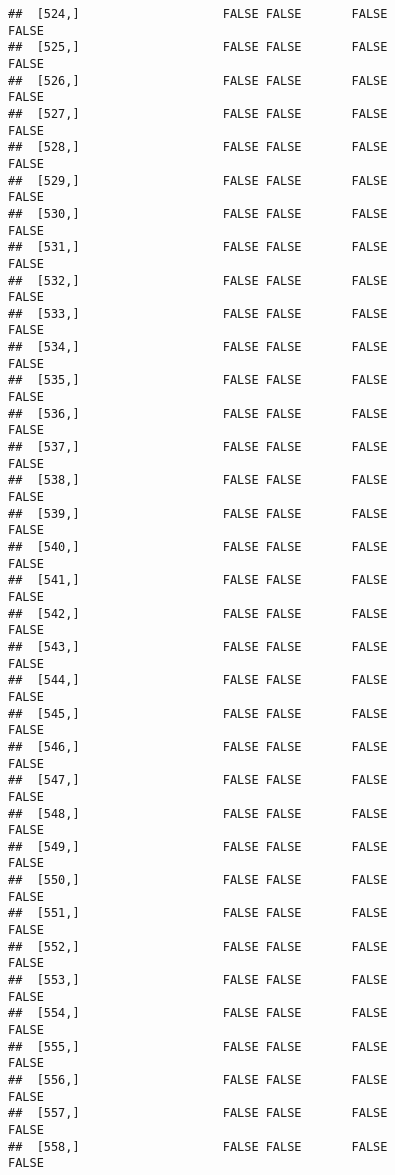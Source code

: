 \documentclass[
]{article}
\begin{document}
\begin{verbatim}
##  [524,]                    FALSE FALSE       FALSE                FALSE
##  [525,]                    FALSE FALSE       FALSE                FALSE
##  [526,]                    FALSE FALSE       FALSE                FALSE
##  [527,]                    FALSE FALSE       FALSE                FALSE
##  [528,]                    FALSE FALSE       FALSE                FALSE
##  [529,]                    FALSE FALSE       FALSE                FALSE
##  [530,]                    FALSE FALSE       FALSE                FALSE
##  [531,]                    FALSE FALSE       FALSE                FALSE
##  [532,]                    FALSE FALSE       FALSE                FALSE
##  [533,]                    FALSE FALSE       FALSE                FALSE
##  [534,]                    FALSE FALSE       FALSE                FALSE
##  [535,]                    FALSE FALSE       FALSE                FALSE
##  [536,]                    FALSE FALSE       FALSE                FALSE
##  [537,]                    FALSE FALSE       FALSE                FALSE
##  [538,]                    FALSE FALSE       FALSE                FALSE
##  [539,]                    FALSE FALSE       FALSE                FALSE
##  [540,]                    FALSE FALSE       FALSE                FALSE
##  [541,]                    FALSE FALSE       FALSE                FALSE
##  [542,]                    FALSE FALSE       FALSE                FALSE
##  [543,]                    FALSE FALSE       FALSE                FALSE
##  [544,]                    FALSE FALSE       FALSE                FALSE
##  [545,]                    FALSE FALSE       FALSE                FALSE
##  [546,]                    FALSE FALSE       FALSE                FALSE
##  [547,]                    FALSE FALSE       FALSE                FALSE
##  [548,]                    FALSE FALSE       FALSE                FALSE
##  [549,]                    FALSE FALSE       FALSE                FALSE
##  [550,]                    FALSE FALSE       FALSE                FALSE
##  [551,]                    FALSE FALSE       FALSE                FALSE
##  [552,]                    FALSE FALSE       FALSE                FALSE
##  [553,]                    FALSE FALSE       FALSE                FALSE
##  [554,]                    FALSE FALSE       FALSE                FALSE
##  [555,]                    FALSE FALSE       FALSE                FALSE
##  [556,]                    FALSE FALSE       FALSE                FALSE
##  [557,]                    FALSE FALSE       FALSE                FALSE
##  [558,]                    FALSE FALSE       FALSE                FALSE

\end{verbatim}
\end{document}
